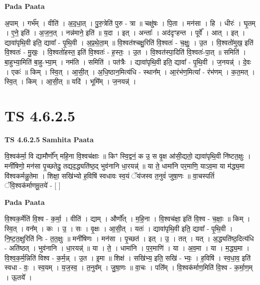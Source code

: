 \documentclass[17pt]{extarticle}
\begin{document}
\textbf{Pada Paata} \newline

अ॒पाम् । गर्भ᳚म् । वीति॑ । अ॒द॒धा॒त् । पु॒रु॒त्रेति॑ पुरु - त्रा ॥ चक्षु॑षः । पि॒ता । मन॑सा । हि । धीरः॑ । घृ॒तम् । ए॒ने॒ इति॑ । अ॒ज॒न॒त् । नन्न॑माने॒ इति॑ ॥ य॒दा । इत् । अन्ताः᳚ । अद॑दृꣳहन्त । पूर्वे᳚ । आत् । इत् । द्यावा॑पृथि॒वी इति॒ द्यावा᳚ - पृ॒थि॒वी । अ॒प्र॒थे॒ता॒म् ॥ वि॒श्वत॑श्चक्षु॒रिति॑ वि॒श्वतः॑ - च॒क्षुः॒ । उ॒त । वि॒श्वतो॑मुख॒ इति॑ वि॒श्वतः॑ - मु॒खः॒ । वि॒श्वतो॑हस्त॒ इति॑ वि॒श्वतः॑ - ह॒स्तः॒ । उ॒त । वि॒श्वत॑स्पा॒दिति॑ वि॒श्वतः॑-पा॒त् ॥ समिति॑ । बा॒हुभ्या॒मिति॑ बा॒हु-भ्या॒म् । नम॑ति । समिति॑ । पत॑त्रैः । द्यावा॑पृथि॒वी इति॒ द्यावा᳚ - पृ॒थि॒वी । ज॒नयन्न्॑ । दे॒वः । एकः॑ ॥ किम् । स्वि॒त् । आ॒सी॒त् । अ॒धि॒ष्ठान॒मित्य॑धि - स्थान᳚म् । आ॒रंभ॑ण॒मित्या᳚ - रंभ॑णम् । क॒त॒मत् । स्वि॒त् । किम् । आ॒सी॒त् ॥ यदि॑ । भूमि᳚म् । ज॒नयन्न्॑ ।  \newline





\section{ TS 4.6.2.5 }

\textbf{TS 4.6.2.5 } \newline
\textbf{Samhita Paata} \newline

वि॒श्वक॑र्मा॒ वि द्यामौर्णो᳚न् महि॒ना वि॒श्वच॑क्षाः ॥ किꣳ स्वि॒द्वनं॒ क उ॒ स वृ॒क्ष आ॑सी॒द्यतो॒ द्यावा॑पृथि॒वी नि॑ष्टत॒क्षुः । मनी॑षिणो॒ मन॑सा पृ॒च्छतेदु॒ तद्यद॒द्ध्यति॑ष्ठ॒द् भुव॑नानि धा॒रयन्न्॑ ॥ या ते॒ धामा॑नि पर॒माणि॒ याऽव॒मा या म॑द्ध्य॒मा वि॑श्वकर्मन्नु॒तेमा । शिक्षा॒ सखि॑भ्यो ह॒विषि॑ स्वधावः स्व॒यं ॅय॑जस्व त॒नुवं॑ जुषा॒णः ॥ वा॒चस्पतिं॑ ॅवि॒श्वक॑र्माणमू॒तये॑ - [  ] \newline

\textbf{Pada Paata} \newline

वि॒श्वक॒र्मेति॑ वि॒श्व - क॒र्मा॒ । वीति॑ । द्याम् । और्णो᳚त् । म॒हि॒ना । वि॒श्वच॑क्षा॒ इति॑ वि॒श्व - च॒क्षाः॒ ॥ किम् । स्वि॒त् । वन᳚म् । कः । उ॒ । सः । वृ॒क्षः । आ॒सी॒त् । यतः॑ । द्यावा॑पृथि॒वी इति॒ द्यावा᳚ - पृ॒थि॒वी । नि॒ष्ट॒त॒क्षुरिति॑ निः - त॒त॒क्षुः ॥ मनी॑षिणः । मन॑सा । पृ॒च्छत॑ । इत् । उ॒ । तत् । यत् । अ॒द्ध्यति॑ष्ठ॒दित्य॑धि - अति॑ष्ठत् । भुव॑नानि । धा॒रयन्न्॑ ॥ या । ते॒ । धामा॑नि । प॒र॒माणि॑ । या । अ॒व॒मा । या । म॒द्ध्य॒मा । वि॒श्व॒क॒र्म॒न्निति॑ विश्व - क॒र्म॒न्न् । उ॒त । इ॒मा ॥ शिक्ष॑ । सखि॑भ्य॒ इति॒ सखि॑ - भ्यः॒ । ह॒विषि॑ । स्व॒धा॒व॒ इति॑ स्वधा - वः॒ । स्व॒यम् । य॒ज॒स्व॒ । त॒नुव᳚म् । जु॒षा॒णः ॥ वा॒चः । पति᳚म् । वि॒श्वक॑र्माण॒मिति॑ वि॒श्व - क॒र्मा॒ण॒म् । ऊ॒तये᳚ ।  \newline
\end{document}

